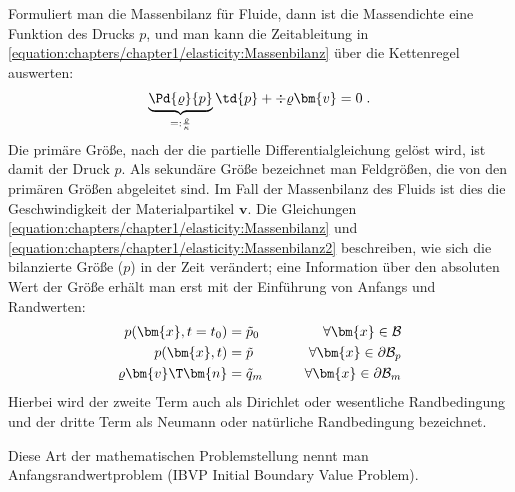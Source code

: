 \documentclass[letterpaper,10pt,german]{jupyterBook}
\begin{document}
\sphinxAtStartPar
Formuliert man die Massenbilanz für Fluide, dann ist die Massendichte eine Funktion des Drucks \(p\), und man kann die Zeitableitung in \eqref{equation:chapters/chapter1/elasticity:Massenbilanz} über die Kettenregel auswerten:
\begin{equation}\label{equation:chapters/chapter1/elasticity:Massenbilanz2}
\begin{split} \underbrace{\Pd{\varrho}{p}}_{=:\frac{\varrho}{\kappa}} \td{p} + \div{\varrho {\bm{v}}} = 0 \; .\end{split}
\end{equation}
\sphinxAtStartPar
Die primäre Größe, nach der die partielle Differentialgleichung gelöst wird, ist damit der Druck \(p\). Als sekundäre Größe bezeichnet man Feldgrößen, die von den primären Größen abgeleitet sind. Im Fall der Massenbilanz des Fluids ist dies die Geschwindigkeit der Materialpartikel \(\bm{v}\). Die Gleichungen \eqref{equation:chapters/chapter1/elasticity:Massenbilanz} und \eqref{equation:chapters/chapter1/elasticity:Massenbilanz2} beschreiben, wie sich die bilanzierte Größe (\(p\)) in der Zeit verändert; eine Information über den absoluten Wert der Größe erhält man erst mit der Einführung von Anfangs\sphinxhyphen{} und Randwerten:
\label{equation:chapters/chapter1/elasticity:32078998-4808-49c1-83de-2fd766851882}\begin{align}
p(\bm{x},t=t_0) & = \tilde{p}_0 \qquad &\forall \bm{x} \in \mathcal{B}& \\
p(\bm{x},t) & = \tilde{p} \qquad &\forall \bm{x} \in \partial \mathcal{B}_p& \\
\varrho \bm{v}\T \bm{n} & = \tilde{q}_m \qquad &\forall \bm{x} \in \partial\mathcal{B}_m&
\end{align}
\sphinxAtStartPar
Hierbei wird der zweite Term auch als Dirichlet oder wesentliche Randbedingung und der dritte Term als Neumann oder natürliche Randbedingung bezeichnet.

\sphinxAtStartPar
Diese Art der mathematischen Problemstellung nennt man Anfangsrandwertproblem (IBVP \sphinxhyphen{} Initial Boundary Value Problem).
\end{document}

